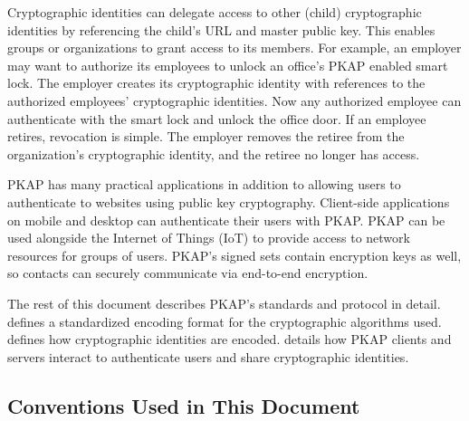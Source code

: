\documentclass{article}
\newcommand{\pkap}{PKAP}
\newcommand{\todo}[1]{\textcolor{red}{#1}}
\begin{document}
Cryptographic identities can delegate access to other (child) cryptographic identities by referencing the child's URL and master public key. 
This enables groups or organizations to grant access to its members. 
For example, an employer may want to authorize its employees to unlock an office's \pkap{} enabled smart lock. 
The employer creates its cryptographic identity with references to the authorized employees' cryptographic identities. 
Now any authorized employee can authenticate with the smart lock and unlock the office door. 
If an employee retires, revocation is simple. 
The employer removes the retiree from the organization's cryptographic identity, and the retiree no longer has access. 

\pkap{} has many practical applications in addition to allowing users to authenticate to websites using public key cryptography. 
Client-side applications on mobile and desktop can authenticate their users with \pkap{}. 
\pkap{} can be used alongside the Internet of Things (IoT) to provide access to network resources for groups of users. 
\pkap{}'s signed sets contain encryption keys as well, so contacts can securely communicate via end-to-end encryption. 



The rest of this document describes \pkap{}'s standards and protocol in detail. 
 defines a standardized encoding format for the cryptographic algorithms used. 
 defines how cryptographic identities are encoded. 
 details how \pkap{} clients and servers interact to authenticate users and share cryptographic identities. 

\subsection{Conventions Used in This Document}
\end{document}
